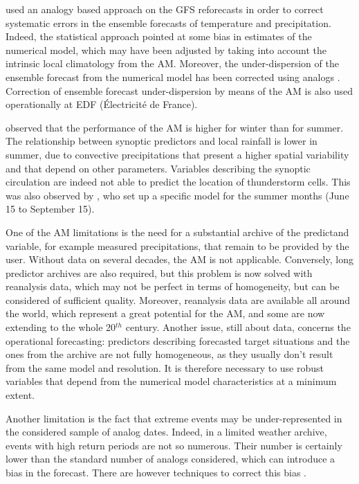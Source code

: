 \documentclass[review]{elsarticle}
\begin{document}
\citet{Hamill2006} used an analogy based approach on the GFS reforecasts in order to correct systematic errors in the ensemble forecasts of temperature and precipitation. Indeed, the statistical approach pointed at some bias in estimates of the numerical model, which may have been adjusted by taking into account the intrinsic local climatology from the AM. Moreover, the under-dispersion of the ensemble forecast from the numerical model has been corrected using analogs \citep{Hamill2006}. Correction of ensemble forecast under-dispersion by means of the AM is also used operationally at EDF (\'{E}lectricit\'{e} de France).

\citet{Bliefernicht2010} observed that the performance of the AM is higher for winter than for summer. The relationship between synoptic predictors and local rainfall is lower in summer, due to convective precipitations that present a higher spatial variability and that depend on other parameters. Variables describing the synoptic circulation are indeed not able to predict the location of thunderstorm cells. This was also observed by \citet{BenDaoud2010}, who set up a specific model for the summer months (June 15 to September 15).

One of the AM limitations is the need for a substantial archive of the predictand variable, for example measured precipitations, that remain to be provided by the user. Without data on several decades, the AM is not applicable. Conversely, long predictor archives are also required, but this problem is now solved with reanalysis data, which may not be perfect in terms of homogeneity, but can be considered of sufficient quality. Moreover,  reanalysis data are available all around the world, which represent a great potential for the AM, and some are now extending to the whole 20$^{th}$ century. Another issue, still about data, concerns the operational forecasting: predictors describing forecasted target situations and the ones from the archive are not fully homogeneous, as they usually don't result from the same model and resolution. It is therefore necessary to use robust variables that depend from the numerical model characteristics at a minimum extent.

Another limitation is the fact that extreme events may be under-represented in the considered sample of analog dates. Indeed, in a limited weather archive, events with high return periods are not so numerous. Their number is certainly lower than the standard number of analogs considered, which can introduce a bias in the forecast. There are however techniques to correct this bias \citep[see][]{Marty2010}.
\end{document}

